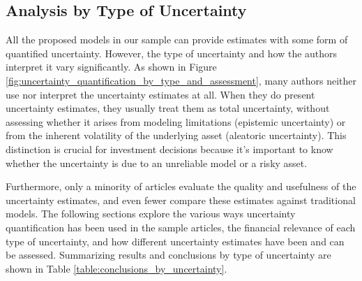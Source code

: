 


\subsection{Analysis by Type of Uncertainty}
\label{sec:analysis_by_type_of_uncertainty}

All the proposed models in our sample can provide estimates with some form of quantified uncertainty. However, the type of uncertainty and how the authors interpret it vary significantly. As shown in Figure \ref{fig:uncertainty_quantification_by_type_and_assessment}, many authors neither use nor interpret the uncertainty estimates at all. When they do present uncertainty estimates, they usually treat them as total uncertainty, without assessing whether it arises from modeling limitations (epistemic uncertainty) or from the inherent volatility of the underlying asset (aleatoric uncertainty). This distinction is crucial for investment decisions because it's important to know whether the uncertainty is due to an unreliable model or a risky asset.

Furthermore, only a minority of articles evaluate the quality and usefulness of the uncertainty estimates, and even fewer compare these estimates against traditional models. The following sections explore the various ways uncertainty quantification has been used in the sample articles, the financial relevance of each type of uncertainty, and how different uncertainty estimates have been and can be assessed. Summarizing results and conclusions by type of uncertainty are shown in Table \ref{table:conclusions_by_uncertainty}.


